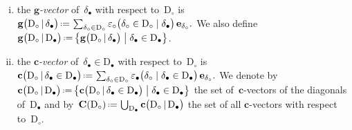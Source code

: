 \documentclass{amsart}
\theoremstyle{definition}
\renewcommand{\b}[1]{\mathbf{#1}} %
\newcommand{\bigset}[2]{\big\{ #1 \;\big|\; #2 \big\}} %
\newcommand{\eqdef}{\mbox{\,\raisebox{0.2ex}{\scriptsize\ensuremath{\mathrm:}}\ensuremath{=}\,}} %
\newcommand{\darkblue}{\color{darkblue}} %
\newcommand{\defn}[1]{\textsl{\darkblue #1}} %
\newcommand{\dissection}{\mathrm{D}} %
\newcommand{\signcirc}[3]{{\varepsilon_\circ \big( {#1} \in {#2} \;|\; {#3} \big)}} %
\newcommand{\signbullet}[3]{{\varepsilon_\bullet \big( {#1} \;|\; {#3} \in {#2} \big)}} %
\newcommand{\biggvector}[2]{\mathbf{g} \big( #1 \,|\, #2 \big)} %
\newcommand{\biggvectors}[2]{\mathbf{g} \big( #1 \,|\, #2 \big)} %
\newcommand{\bigcvector}[3]{\mathbf{c} \big( #1  \,|\, #3 \in #2 \big)} %
\newcommand{\bigcvectors}[2]{\mathbf{c} \big( #1  \,|\, #2 \big)} %
\newcommand{\allcvectors}[1]{\mathbf{C}(#1)} %
\begin{document}
\begin{enumerate}[(i)]

\item the \defn{$\b{g}$-vector} of~$\delta_\bullet$ with respect to~$\dissection_\circ$ is
\({
\biggvector{\dissection_\circ}{\delta_\bullet} \eqdef \sum_{\delta_\circ \in \dissection_\circ} \signcirc{\delta_\circ}{\dissection_\circ}{\delta_\bullet} \, \b{e}_{\delta_\circ}.
}\)
We also define~$\biggvectors{\dissection_\circ}{\dissection_\bullet} \eqdef \bigset{\biggvector{\dissection_\circ}{\delta_\bullet}}{\delta_\bullet \in \dissection_\bullet}$. \\[-.2cm]

\item the \defn{$\b{c}$-vector} of~$\delta_\bullet \in \dissection_\bullet$ with respect to~$\dissection_\circ$ is
\({
\bigcvector{\dissection_\circ}{\dissection_\bullet}{\delta_\bullet} \eqdef \sum_{\delta_\circ \in \dissection_\circ} \signbullet{\delta_\circ}{\dissection_\bullet}{\delta_\bullet} \, \b{e}_{\delta_\circ}.
}\)
We denote by~$\bigcvectors{\dissection_\circ}{\dissection_\bullet} \eqdef \bigset{\bigcvector{\dissection_\circ}{\dissection_\bullet}{\delta_\bullet}}{\delta_\bullet \in \dissection_\bullet}$ the set of~$\b{c}$-vectors of the diagonals of~$\dissection_\bullet$  and by~$\allcvectors{\dissection_\circ} \eqdef \bigcup_{\dissection_\bullet} \bigcvectors{\dissection_\circ}{\dissection_\bullet}$ the set of all $\b{c}$-vectors with respect to~$\dissection_\circ$.

\end{enumerate}
\end{document}

